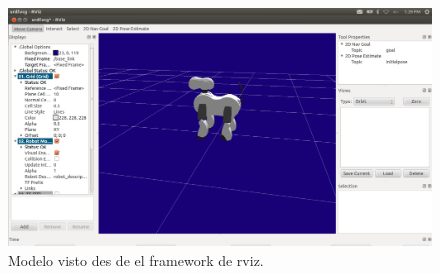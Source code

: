 \documentclass[12pt,a4paper,final,twoside]{article}
\begin{document}
\begin{figure}[H]
	\centering
    \includegraphics[scale=0.32]{images/aiborviz.png}
	 \caption{Modelo visto des de el framework de rviz.}
  \label{fig:aiborviz}
\end{figure}
\end{document}
